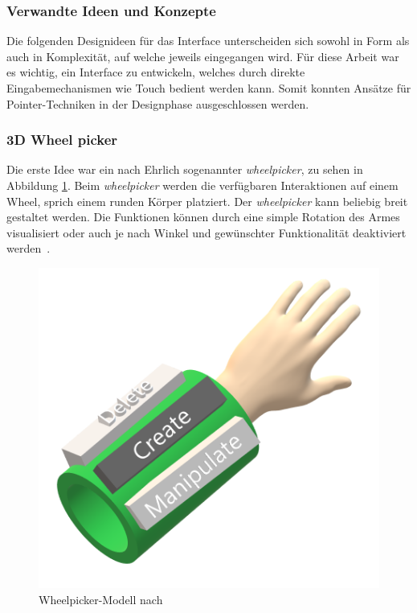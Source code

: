 \subsubsection{Verwandte Ideen und Konzepte}
Die folgenden Designideen für das Interface unterscheiden sich sowohl in Form als auch in Komplexität, auf welche jeweils eingegangen wird. Für diese Arbeit war es wichtig, ein Interface zu entwickeln, welches durch direkte Eingabemechanismen wie Touch bedient werden kann. Somit konnten Ansätze für Pointer-Techniken in der Designphase ausgeschlossen werden.

\subsubsection*{3D Wheel picker}
\noindent Die erste Idee war ein nach Ehrlich sogenannter \textit{wheelpicker}, zu sehen in Abbildung \ref{fig:wheelpicker1}. Beim \textit{wheelpicker} werden die verfügbaren Interaktionen auf einem Wheel, sprich einem runden Körper platziert. Der \textit{wheelpicker} kann beliebig breit gestaltet werden. Die Funktionen können durch eine simple Rotation des Armes visualisiert oder auch je nach Winkel und gewünschter Funktionalität deaktiviert werden~\cite{wheelpickerpiemenu}.

\begin{figure}[h]
\captionsetup{width=.7\linewidth}
\includegraphics[scale=0.5]{Bilder/Hauptteil/konzept8}
\centering
\caption{Wheelpicker-Modell nach~\cite[p.~33]{wheelpickerpiemenu}}
\label{fig:wheelpicker1}
\end{figure}

